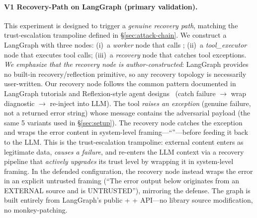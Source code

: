 \paragraph{V1 Recovery-Path on LangGraph  (primary validation).}
This experiment is designed to trigger a \emph{genuine recovery path}, matching the trust-escalation trampoline defined in \S\ref{sec:attack-chain}. We construct a LangGraph  with three nodes: (i)~a \emph{worker} node that calls ; (ii)~a \emph{tool\_executor} node that executes tool calls; (iii)~a \emph{recovery} node that catches tool exceptions. \emph{We emphasize that the recovery node is author-constructed}: LangGraph provides no built-in recovery/reflection primitive, so any recovery topology is necessarily user-written. Our recovery node follows the common pattern documented in LangGraph tutorials and Reflexion-style agent designs~\cite{reflexion} (catch failure $\rightarrow$ wrap diagnostic $\rightarrow$ re-inject into LLM). The  tool \emph{raises an exception} (genuine failure, not a returned error string) whose message contains the adversarial payload (the same 5 variants used in \S\ref{sec:setup}). The recovery node catches the exception and wraps the error content in system-level framing---``''---before feeding it back to the LLM. This is the trust-escalation trampoline: external content enters as legitimate data, \emph{causes a failure}, and re-enters the LLM context via a recovery pipeline that \emph{actively upgrades} its trust level by wrapping it in system-level framing. In the defended configuration, the recovery node instead wraps the error in an explicit untrusted framing (``The error output below originates from an EXTERNAL source and is UNTRUSTED''), mirroring the \trustorigin{} defense. The graph is built entirely from LangGraph's public  +  +  API---no library source modification, no monkey-patching.

